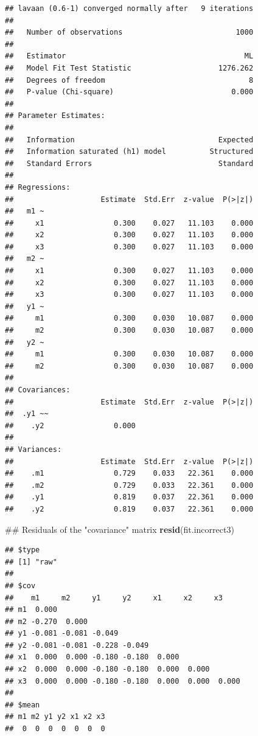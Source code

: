 \documentclass[]{article}
\newenvironment{Shaded}{\begin{snugshade}}{\end{snugshade}}
\newcommand{\KeywordTok}[1]{\textcolor[rgb]{0.13,0.29,0.53}{\textbf{#1}}}
\newcommand{\NormalTok}[1]{#1}
\begin{document}
\begin{verbatim}
## lavaan (0.6-1) converged normally after   9 iterations
## 
##   Number of observations                          1000
## 
##   Estimator                                         ML
##   Model Fit Test Statistic                    1276.262
##   Degrees of freedom                                 8
##   P-value (Chi-square)                           0.000
## 
## Parameter Estimates:
## 
##   Information                                 Expected
##   Information saturated (h1) model          Structured
##   Standard Errors                             Standard
## 
## Regressions:
##                    Estimate  Std.Err  z-value  P(>|z|)
##   m1 ~                                                
##     x1                0.300    0.027   11.103    0.000
##     x2                0.300    0.027   11.103    0.000
##     x3                0.300    0.027   11.103    0.000
##   m2 ~                                                
##     x1                0.300    0.027   11.103    0.000
##     x2                0.300    0.027   11.103    0.000
##     x3                0.300    0.027   11.103    0.000
##   y1 ~                                                
##     m1                0.300    0.030   10.087    0.000
##     m2                0.300    0.030   10.087    0.000
##   y2 ~                                                
##     m1                0.300    0.030   10.087    0.000
##     m2                0.300    0.030   10.087    0.000
## 
## Covariances:
##                    Estimate  Std.Err  z-value  P(>|z|)
##  .y1 ~~                                               
##    .y2                0.000                           
## 
## Variances:
##                    Estimate  Std.Err  z-value  P(>|z|)
##    .m1                0.729    0.033   22.361    0.000
##    .m2                0.729    0.033   22.361    0.000
##    .y1                0.819    0.037   22.361    0.000
##    .y2                0.819    0.037   22.361    0.000
\end{verbatim}

\begin{Shaded}
\begin{Highlighting}[]
\NormalTok{## Residuals of the "covariance" matrix}
\KeywordTok{resid}\NormalTok{(fit.incorrect3)}
\end{Highlighting}
\end{Shaded}

\begin{verbatim}
## $type
## [1] "raw"
## 
## $cov
##    m1     m2     y1     y2     x1     x2     x3    
## m1  0.000                                          
## m2 -0.270  0.000                                   
## y1 -0.081 -0.081 -0.049                            
## y2 -0.081 -0.081 -0.228 -0.049                     
## x1  0.000  0.000 -0.180 -0.180  0.000              
## x2  0.000  0.000 -0.180 -0.180  0.000  0.000       
## x3  0.000  0.000 -0.180 -0.180  0.000  0.000  0.000
## 
## $mean
## m1 m2 y1 y2 x1 x2 x3 
##  0  0  0  0  0  0  0
\end{verbatim}
\end{document}
